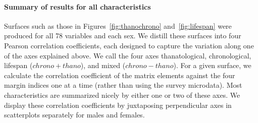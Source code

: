 \documentclass[11pt,oneside,a4paper]{article}
\begin{document}
\paragraph{Summary of results for all characteristics}
Surfaces such as those in Figures~\ref{fig:thanochrono} and~\ref{fig:lifespan}
were produced for all 78 variables and each sex. We distill these surfaces into
four Pearson correlation coefficients, each designed to capture the variation along one of the axes explained above. We call the four axes
thanatological, chronological, lifespan ($chrono+thano$), and mixed
($chrono-thano$). For a given surface, we calculate the correlation
coefficient of the matrix elements against the four margin indices one at a
time (rather than using the survey microdata).
Most characteristics are summarized nicely by either one or two of these axes.
We display these correlation coefficients by juxtaposing perpendicular axes in
scatterplots separately for males and females.
\end{document}
